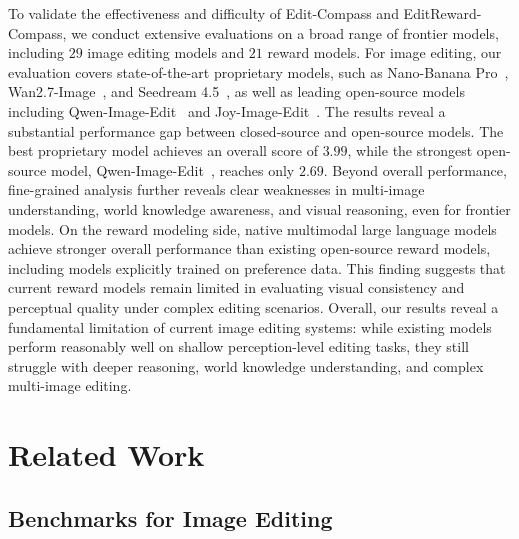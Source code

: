 \documentclass{llmxive}
\providecommand{\bench}{Edit-Compass}
\providecommand{\rmbench}{EditReward-Compass}
\begin{document}
To validate the effectiveness and difficulty of {\bench} and {\rmbench}, we conduct extensive evaluations on a broad range of frontier models, including $29$ image editing models and $21$ reward models.
For image editing, our evaluation covers state-of-the-art proprietary models, such as Nano-Banana Pro~\cite{nanobananapro}, Wan2.7-Image~\cite{wan}, and Seedream 4.5~\cite{seedream2025seedream}, as well as leading open-source models including Qwen-Image-Edit~\cite{wu2025qwen} and Joy-Image-Edit~\cite{joyaiimage2026}.
The results reveal a substantial performance gap between closed-source and open-source models.
The best proprietary model achieves an overall score of $3.99$, while the strongest open-source model, Qwen-Image-Edit~\cite{wu2025qwen}, reaches only $2.69$.
Beyond overall performance, fine-grained analysis further reveals clear weaknesses in multi-image understanding, world knowledge awareness, and visual reasoning, even for frontier models.
On the reward modeling side, native multimodal large language models~\cite{qwen3.5,qwen36_35b_a3b,zhang2025debiasing,wang2025monet,qwen3.6-27b,shi2025mavors} achieve stronger overall performance than existing open-source reward models, including models explicitly trained on preference data.
This finding suggests that current reward models remain limited in evaluating visual consistency and perceptual quality under complex editing scenarios.
Overall, our results reveal a fundamental limitation of current image editing systems: while existing models perform reasonably well on shallow perception-level editing tasks, they still struggle with deeper reasoning, world knowledge understanding, and complex multi-image editing.

\section{Related Work}

\subsection{Benchmarks for Image Editing}

\end{document}

